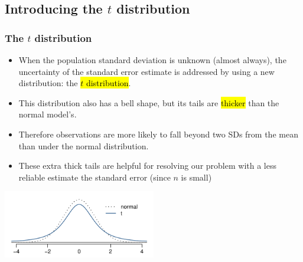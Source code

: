 
\subsection{Introducing the $t$ distribution}


\begin{frame}
\frametitle{The $t$ distribution}

\begin{itemize}

\item When the population standard deviation is unknown (almost always), the uncertainty of the standard error estimate is addressed by using a new distribution: the \hl{$t$ distribution}.

\pause

\item This distribution also has a bell shape, but its tails are \hl{thicker} than the normal model's.

\pause

\item Therefore observations are more likely to fall beyond two SDs from the mean than under the normal distribution.

\pause

\item These extra thick tails are helpful for resolving our problem with a less reliable estimate the standard error (since $n$ is small)

\end{itemize}

\begin{center}
\includegraphics[width=0.5\textwidth]{5-1_one_t/figures/tDistCompareToNormalDist/tDistCompareToNormalDist}
\end{center}

\end{frame}


